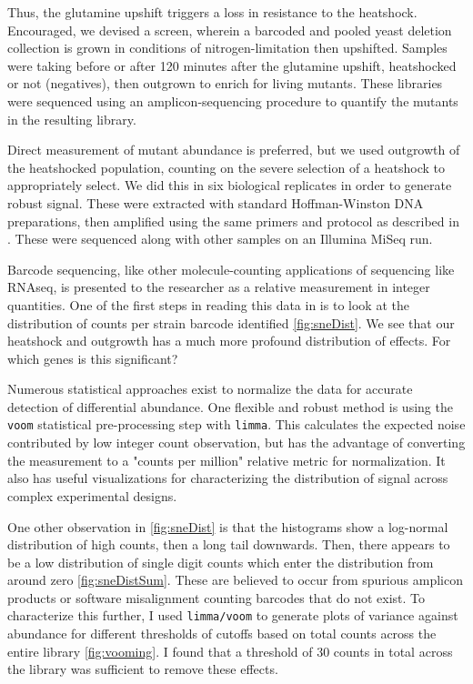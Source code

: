 Thus, the glutamine upshift triggers a loss in resistance to the
heatshock.  Encouraged, we devised a screen, wherein a barcoded 
and pooled yeast deletion collection
is grown in conditions of nitrogen-limitation then upshifted.
Samples were taking before or 
after 120 minutes after the glutamine upshift,
heatshocked or not (negatives),
then outgrown to enrich for living mutants.
These libraries were sequenced using an amplicon-sequencing procedure
to quantify the mutants in the resulting library.

Direct measurement of mutant abundance is preferred, but we used
outgrowth of the heatshocked population, counting on the severe
selection of a heatshock to appropriately select.
We did this in six biological replicates in order to generate robust
signal.
These were extracted with standard Hoffman-Winston DNA preparations,
then amplified using the same primers and protocol as described in
\parencite{robinson2014design}. These were sequenced along with other
samples on an Illumina MiSeq run.

Barcode sequencing, like other molecule-counting applications of
sequencing like RNAseq, is presented to the researcher as a relative 
measurement in integer quantities. 
One of the first steps in reading this data in is to look at the
distribution of counts per strain barcode identified
\autoref{fig:sneDist}.
We see that our heatshock and outgrowth has a much more profound
distribution of effects.
For which genes is this significant?


Numerous statistical approaches
exist to normalize the data for accurate detection of differential
abundance. One flexible and robust method is using the \texttt{voom}
statistical pre-processing step with \texttt{limma}. 
This calculates
the expected noise contributed by low integer count observation, but
has the advantage of converting the measurement to a "counts per
million" relative metric for normalization. 
It also has useful visualizations for characterizing the 
distribution of signal across complex experimental designs.

One other observation in \autoref{fig:sneDist} is that the histograms
show a log-normal distribution of high counts, then a long tail
downwards. 
Then, there appears to be a low distribution of single digit counts
which enter the distribution from around zero \autoref{fig:sneDistSum}.
These are believed to occur from spurious amplicon products or
software misalignment counting barcodes that do not exist.
To characterize this further, I used \texttt{limma/voom} to generate
plots of variance against abundance for different thresholds of
cutoffs based on total counts across the entire library
\autoref{fig:vooming}.
I found that a threshold of 30 counts in total across the library
was sufficient to remove these effects.

